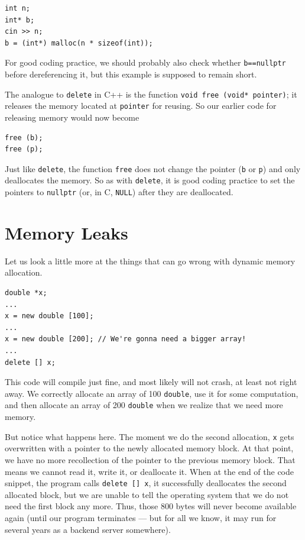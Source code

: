 \begin{verbatim}
int n;
int* b;
cin >> n;
b = (int*) malloc(n * sizeof(int));
\end{verbatim}

For good coding practice, we should probably also check whether
\texttt{b==nullptr} before dereferencing it,
but this example is supposed to remain short.

\smallskip

The analogue to \texttt{delete} in C++ is the function 
\texttt{void free (void* pointer)};
it releases the memory located at \texttt{pointer} for reusing.
So our earlier code for releasing memory would now become

\begin{verbatim}
free (b);
free (p);
\end{verbatim}

Just like \texttt{delete}, the function \texttt{free} does not change the
pointer (\texttt{b} or \texttt{p}) and only deallocates the memory.
So as with \texttt{delete}, it is good coding practice to set the
pointers to \texttt{nullptr} (or, in C, \texttt{NULL}) after they are
deallocated.


\section{Memory Leaks}
Let us look a little more at the things that can go wrong with dynamic
memory allocation.

\begin{verbatim}
double *x;
...
x = new double [100];
...
x = new double [200]; // We're gonna need a bigger array!
...
delete [] x;
\end{verbatim}

This code will compile just fine, and most likely will not crash,
at least not right away.
We correctly allocate an array of 100 \texttt{double},
use it for some computation,
and then allocate an array of 200 \texttt{double} when we
realize that we need more memory.

But notice what happens here.
The moment we do the second allocation, \texttt{x} gets overwritten with
a pointer to the newly allocated memory block.
At that point, we have no more recollection of the pointer to
the previous memory block.
That means we cannot read it, write it, or deallocate it.
When at the end of the code snippet,
the program calls \texttt{delete [] x},
it successfully deallocates the second allocated block,
but we are unable to tell the operating system that we do not need the
first block any more. 
Thus, those 800 bytes will never become available again
(until our program terminates --- but for all we know, it may run for
several years as a backend server somewhere).

